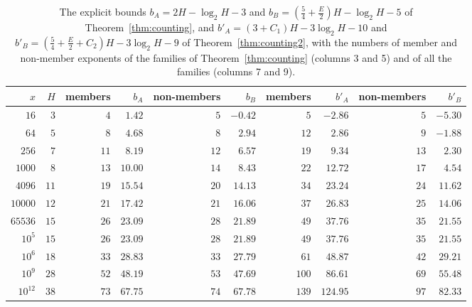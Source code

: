 \documentclass[11pt]{amsart}
\theoremstyle{definition}
\begin{document}
\begin{table}[H]
\centering
\caption{The explicit bounds $b_A=2H-\log_2H-3$ and $b_B=(\frac54+\frac E2)H-\log_2H-5$ of Theorem~\ref{thm:counting}, and $b'_A=(3+C_1)H-3\log_2H-10$ and $b'_B=(\frac54+\frac E2+C_2)H-3\log_2H-9$ of Theorem~\ref{thm:counting2}, with the numbers of member and non-member exponents of the families of Theorem~\ref{thm:counting} (columns 3 and 5) and of all the families (columns 7 and 9).}
\label{tab:explicit}
\begin{tabular}{rrrrrrrrrr}
\toprule
$x$ & $H$ & members & $b_A$ & non-members & $b_B$ & members & $b'_A$ & non-members & $b'_B$\\
\midrule
$16$ & $3$ & $4$ & $1.42$ & $5$ & $-0.42$ & $5$ & $-2.86$ & $5$ & $-5.30$\\
$64$ & $5$ & $8$ & $4.68$ & $8$ & $2.94$ & $12$ & $2.86$ & $9$ & $-1.88$\\
$256$ & $7$ & $11$ & $8.19$ & $12$ & $6.57$ & $19$ & $9.34$ & $13$ & $2.30$\\
$1000$ & $8$ & $13$ & $10.00$ & $14$ & $8.43$ & $22$ & $12.72$ & $17$ & $4.54$\\
$4096$ & $11$ & $19$ & $15.54$ & $20$ & $14.13$ & $34$ & $23.24$ & $24$ & $11.62$\\
$10000$ & $12$ & $21$ & $17.42$ & $21$ & $16.06$ & $37$ & $26.83$ & $25$ & $14.06$\\
$65536$ & $15$ & $26$ & $23.09$ & $28$ & $21.89$ & $49$ & $37.76$ & $35$ & $21.55$\\
$10^{5}$ & $15$ & $26$ & $23.09$ & $28$ & $21.89$ & $49$ & $37.76$ & $35$ & $21.55$\\
$10^{6}$ & $18$ & $33$ & $28.83$ & $33$ & $27.79$ & $61$ & $48.87$ & $42$ & $29.21$\\
$10^{9}$ & $28$ & $52$ & $48.19$ & $53$ & $47.69$ & $100$ & $86.61$ & $69$ & $55.48$\\
$10^{12}$ & $38$ & $73$ & $67.75$ & $74$ & $67.78$ & $139$ & $124.95$ & $97$ & $82.33$\\
\bottomrule
\end{tabular}
\end{table}
\end{document}
